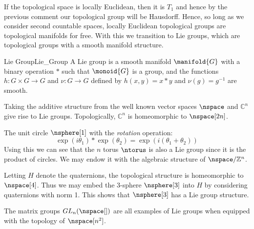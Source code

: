 \documentclass[oneside]{book}                                                  %
\begin{document}
            If the topological space is locally Euclidean, then it is $T_{1}$
            and hence by the previous comment our topological group will be
            Hausdorff. Hence, so long as we consider second countable spaces,
            locally Euclidean topological groups are topological manifolds for
            free. With this we transition to Lie groups, which are topological
            groups with a smooth manifold structure.
            \begin{fdefinition}{Lie Group}{Lie_Group}
                A Lie group is a smooth manifold $\manifold{G}$ with a binary
                operation $*$ such that $\monoid{G}$ is a group, and the
                functions $h:G\times{G}\rightarrow{G}$ and $\nu:G\rightarrow{G}$
                defined by $h(x,y)=x*y$ and $\nu(g)=g^{\minus{1}}$ are smooth.
            \end{fdefinition}
            \begin{example}
                Taking the additive structure from the well known vector spaces
                $\nspace$ and $\mathbb{C}^{n}$ give rise to Lie groups.
                Topologically, $\mathbb{C}^{n}$ is homeomorphic to
                $\nspace[2n]$.
            \end{example}
            \begin{example}
                The unit circle $\nsphere[1]$ with the \textit{rotation}
                operation:
                \begin{equation}
                    \exp(i\theta_{1})*\exp(\theta_{2})
                        =\exp(i(\theta_{1}+\theta_{2}))
                \end{equation}
                Using this we can see that the $n$ torus $\ntorus$ is also a
                Lie group since it is the product of circles. We may endow it
                with the algebraic structure of $\nspace/\mathbb{Z}^{n}$.
            \end{example}
            \begin{example}
                Letting $H$ denote the quaternions, the topological structure is
                homeomorphic to $\nspace[4]$. Thus we may embed the 3-sphere
                $\nsphere[3]$ into $H$ by considering quaternions with norm 1.
                This shows that $\nsphere[3]$ has a Lie group structure.
            \end{example}
            \begin{example}
                The matrix groups $GL_{n}(\nspace[])$ are all examples of Lie
                groups when equipped with the topology of $\nspace[n^{2}]$.
            \end{example}
\end{document}
